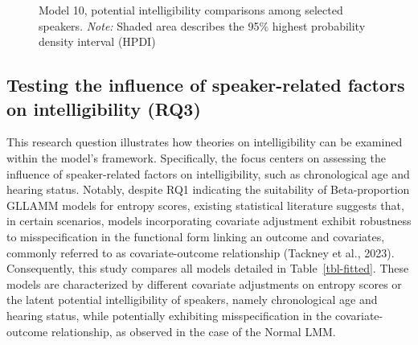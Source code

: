 \documentclass[
]{agujournal2019}
\begin{document}
\label{cell-fig-si_contr_model10}
\begin{figure}[H]


\caption{\label{fig-si_contr_model10}Model 10, potential intelligibility
comparisons among selected speakers. \emph{Note:} Shaded area describes
the 95\% highest probability density interval (HPDI)}

\end{figure}%

\subsection{Testing the influence of speaker-related factors on
intelligibility (RQ3)}\label{sec-R-RQ3}

This research question illustrates how theories on intelligibility can
be examined within the model's framework. Specifically, the focus
centers on assessing the influence of speaker-related factors on
intelligibility, such as chronological age and hearing status. Notably,
despite RQ1 indicating the suitability of Beta-proportion GLLAMM models
for entropy scores, existing statistical literature suggests that, in
certain scenarios, models incorporating covariate adjustment exhibit
robustness to misspecification in the functional form linking an outcome
and covariates, commonly referred to as covariate-outcome relationship
(Tackney et al., 2023). Consequently, this study compares all models
detailed in Table~\ref{tbl-fitted}. These models are characterized by
different covariate adjustments on entropy scores or the latent
potential intelligibility of speakers, namely chronological age and
hearing status, while potentially exhibiting misspecification in the
covariate-outcome relationship, as observed in the case of the Normal
LMM.
\end{document}

